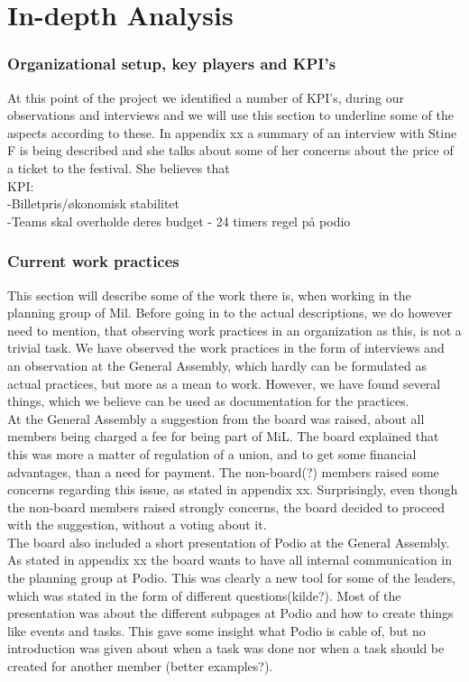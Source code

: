 \part{In-depth Analysis}

\section{Organizational setup, key players and KPI's}
At this point of the project we identified a number of KPI's, during our observations and interviews and we will use this section to underline some of the aspects according to these.
In appendix xx a summary of an interview with Stine F is being described and she talks about some of her concerns about the price of a ticket to the festival. She believes that \\
KPI:\\
-Billetpris/økonomisk stabilitet\\
-Teams skal overholde deres budget
- 24 timers regel på podio
\section{Current work practices}
This section will describe some of the work there is, when working in the planning group of Mil. Before going in to the actual descriptions, we do however need to mention, that observing work practices in an organization as this, is not a trivial task. We have observed the work practices in the form of interviews and an observation at the General Assembly, which hardly can be formulated as actual practices, but more as a mean to work. However, we have found several things, which we believe can be used as documentation for the practices. \\
At the General Assembly a suggestion from the board was raised, about all members being charged a fee for being part of MiL. The board explained that this was more a matter of regulation of a union, and to get some financial advantages, than a need for payment. The non-board(?) members raised some concerns regarding this issue, as stated in appendix xx. Surprisingly, even though the non-board members raised strongly concerns, the board decided to proceed with the suggestion, without a voting about it. \\
The board also included a short presentation of Podio at the General Assembly. As stated in appendix xx the board wants to have all internal communication in the planning group at Podio. This was clearly a new tool for some of the leaders, which was stated in the form of different questions(kilde?). Most of the presentation was about the different subpages at Podio and how to create things like events and tasks. This gave some insight what Podio is cable of, but no introduction was given about when a task was done nor when a task should be created for another member (better examples?).\\

